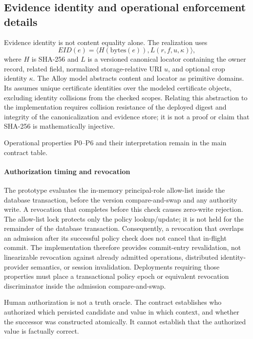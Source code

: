 \subsection{Evidence identity and operational enforcement details}
Evidence identity is not content equality alone. The realization uses
\begin{equation}
EID(e)=\langle H(\mathrm{bytes}(e)),L(r,f,u,\kappa)\rangle,
\label{eq:evidence}
\end{equation}
where $H$ is SHA-256 and $L$ is a versioned canonical locator containing the owner record, related field, normalized storage-relative URI $u$, and optional crop identity $\kappa$. The Alloy model abstracts content and locator as primitive domains. Its  assumes unique certificate identities over the modeled certificate objects, excluding identity collisions from the checked scopes. Relating this abstraction to the implementation requires collision resistance of the deployed digest and integrity of the canonicalization and evidence store; it is not a proof or claim that SHA-256 is mathematically injective.

Operational properties P0--P6 and their interpretation remain in the main contract table.

\paragraph{Authorization timing and revocation}
\label{app:authorization-timing}
The prototype evaluates the in-memory principal-role allow-list inside the database transaction, before the version compare-and-swap and any authority write. A revocation that completes before this check causes zero-write rejection. The allow-list lock protects only the policy lookup/update; it is not held for the remainder of the database transaction. Consequently, a revocation that overlaps an admission after its successful policy check does not cancel that in-flight commit. The implementation therefore provides commit-entry revalidation, not linearizable revocation against already admitted operations, distributed identity-provider semantics, or session invalidation. Deployments requiring those properties must place a transactional policy epoch or equivalent revocation discriminator inside the admission compare-and-swap.

Human authorization is not a truth oracle. The contract establishes who authorized which persisted candidate and value in which context, and whether the successor was constructed atomically. It cannot establish that the authorized value is factually correct.




